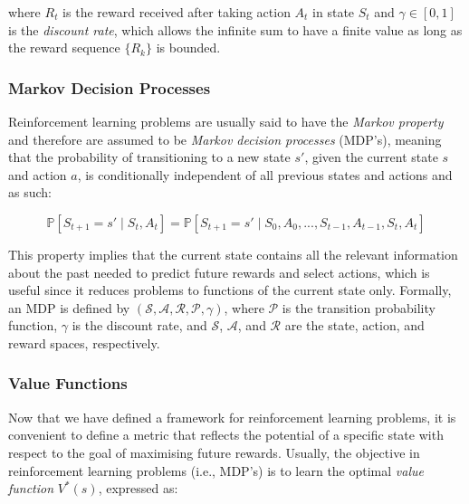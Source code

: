\documentclass[12pt,twoside]{report}
\begin{document}
\noindent where $R_t$ is the reward received after taking action $A_t$ in state $S_t$ and $\gamma \in \left[0,1\right]$ is the \textit{discount rate}, which allows the infinite sum to have a finite value as long as the reward sequence $\lbrace R_k \rbrace$ is bounded. 

\subsubsection{Markov Decision Processes}

Reinforcement learning problems are usually said to have the \textit{Markov property} and therefore are assumed to be \textit{Markov decision processes} (MDP's), meaning that the probability of transitioning to a new state $s'$, given the current state $s$ and action $a$, is conditionally independent of all previous states and actions and as such:

\begin{equation}
    \mathbb{P}\left[S_{t+1} = s' \! \mid \! S_t, A_t \right] =  \mathbb{P}\left[S_{t+1} = s' \! \mid \! S_0, A_0, ..., S_{t-1}, A_{t-1}, S_t, A_t \right]
\end{equation}

This property implies that the current state contains all the relevant information about the past needed to predict future rewards and select actions, which is useful since it reduces problems to functions of the current state only. Formally, an MDP is defined by $\left(\mathcal{S}, \mathcal{A}, \mathcal{R}, \mathcal{P}, \gamma\right)$, where $\mathcal{P}$ is the transition probability function, $\gamma$ is the discount rate, and $\mathcal{S}$, $\mathcal{A}$, and $\mathcal{R}$ are the state, action, and reward spaces, respectively.

\subsubsection{Value Functions}

Now that we have defined a framework for reinforcement learning problems, it is convenient to define a metric that reflects the potential of a specific state with respect to the goal of maximising future rewards. Usually, the objective in reinforcement learning problems (i.e., MDP's) is to learn the optimal \textit{value function} $V^*(s)$, expressed as: 
\end{document}
